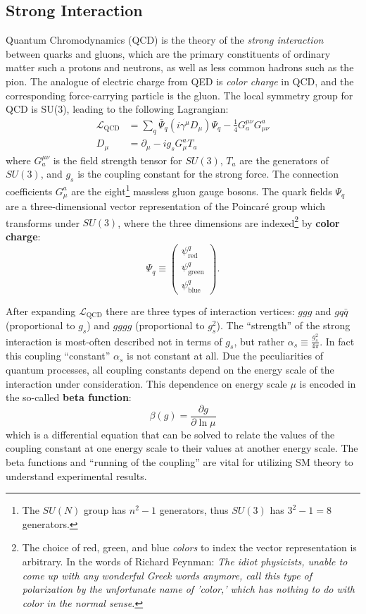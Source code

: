 \subsection{Strong Interaction}
Quantum Chromodynamics (QCD) is the theory of the \textit{strong interaction} between quarks and gluons, which are the primary constituents of ordinary matter such a protons and neutrons, as well as less common hadrons such as the pion.
The analogue of electric charge from QED is \textit{color charge} in QCD, and the corresponding force-carrying particle is the gluon.
The local symmetry group for QCD is SU(3), leading to the following Lagrangian:
\begin{align}
    \mathcal{L}_{\mathrm{QCD}} &= \sum_{q}  \bar{\Psi}_q  (i \gamma^\mu D_\mu) \Psi_q - \frac{1}{4} G_a^{\mu\nu} G^a_{\mu\nu} \\
    D_\mu &= \partial_\mu - i g_s G_\mu^a T_a
\end{align}
where $G_a^{\mu\nu}$ is the field strength tensor for $SU(3)$, $T_a$ are the generators of $SU(3)$, and $g_s$ is the coupling constant for the strong force.
The connection coefficients $G_\mu^a$ are the eight\footnote{The $SU(N)$ group has $n^2-1$ generators, thus $SU(3)$ has $3^2 - 1 = 8$ generators.} massless gluon gauge bosons.
The quark fields $\Psi_q$ are a three-dimensional vector representation of the Poincar\'{e} group which transforms under $SU(3)$, where the three dimensions are indexed\footnote{The choice of red, green, and blue \textit{colors} to index the vector representation is arbitrary. In the words of Richard Feynman: \textit{The idiot physicists, unable to come up with any wonderful Greek words anymore, call this type of polarization by the unfortunate name of 'color,' which has nothing to do with color in the normal sense.}} by \textbf{color charge}:
\begin{equation}
    \Psi_q \equiv 
    \begin{pmatrix}
    \psi^q_{\mathrm{red}} \\
    \psi^q_{\mathrm{green}} \\
    \psi^q_{\mathrm{blue}}
    \end{pmatrix}.
\end{equation}

After expanding $\mathcal{L}_{\mathrm{QCD}}$ there are three types of interaction vertices: $ggg$ and $gq\bar{q}$ (proportional to $g_s$) and $gggg$ (proportional to $g_s^2$).
The ``strength'' of the strong interaction is most-often described not in terms of $g_s$, but rather $\alpha_s \equiv \frac{g_s^2}{4\pi}$.
In fact this coupling ``constant'' $\alpha_s$ is not constant at all.
Due the peculiarities of quantum processes, all coupling constants depend on the energy scale of the interaction under consideration.
This dependence on energy scale $\mu$ is encoded in the so-called \textbf{beta function}:
\begin{equation}
\beta(g) = \frac{\partial g}{\partial \ln \mu}
\end{equation}
which is a differential equation that can be solved to relate the values of the coupling constant at one energy scale to their values at another energy scale.
The beta functions and ``running of the coupling'' are vital for utilizing SM theory to understand experimental results.

